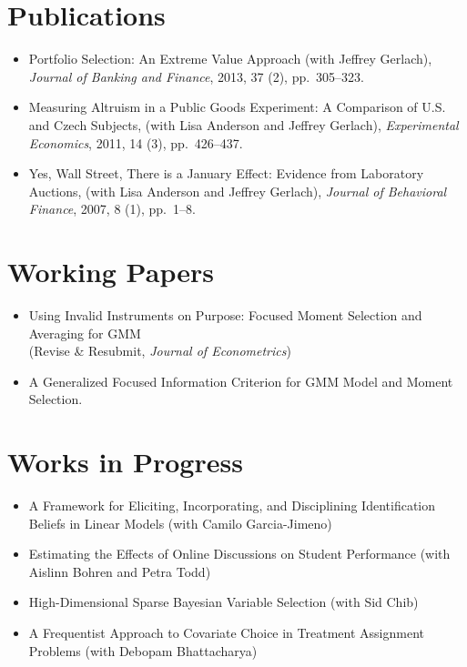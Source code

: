 \documentclass[line,overlapped]{myres}
\begin{document}
\begin{resume}

\section{\sc Publications}
\begin{itemize}
	\item Portfolio Selection: An Extreme Value Approach (with Jeffrey Gerlach), \emph{Journal of Banking and Finance}, 2013, 37 (2), pp.\ 305--323.
	\item Measuring Altruism in a Public Goods Experiment:  A Comparison of U.S. and Czech Subjects, (with Lisa Anderson and Jeffrey Gerlach), \emph{Experimental Economics}, 2011, 14 (3), pp.\ 426--437.
	\item Yes, Wall Street, There is a January Effect: Evidence from Laboratory Auctions, (with Lisa Anderson and Jeffrey Gerlach), \emph{Journal of Behavioral Finance}, 2007, 8 (1), pp.\ 1--8. 
\end{itemize}


\section{\sc Working Papers}
\begin{itemize}
  \item Using Invalid Instruments on Purpose: Focused Moment Selection and Averaging for GMM\\ (Revise \& Resubmit, \emph{Journal of Econometrics})
	\item A Generalized Focused Information Criterion for GMM Model and Moment Selection.
\end{itemize}




\section{\sc Works in Progress}
\begin{itemize}
	\item A Framework for Eliciting, Incorporating, and Disciplining Identification Beliefs in Linear Models (with Camilo Garcia-Jimeno)
  \item Estimating the Effects of Online Discussions on Student Performance (with Aislinn Bohren and Petra Todd)
  \item High-Dimensional Sparse Bayesian Variable Selection (with Sid Chib)
	\item A Frequentist Approach to Covariate Choice in Treatment Assignment Problems (with Debopam Bhattacharya)
\end{itemize}





\end{resume}
\end{document}
